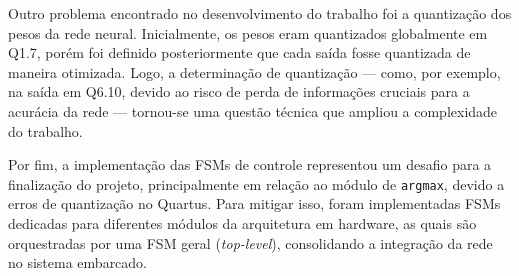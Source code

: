 Outro problema encontrado no desenvolvimento do trabalho foi a quantização dos pesos da rede neural. Inicialmente, os pesos eram quantizados globalmente em Q1.7, porém foi definido posteriormente que cada saída fosse quantizada de maneira otimizada. Logo, a determinação de quantização — como, por exemplo, na saída em Q6.10, devido ao risco de perda de informações cruciais para a acurácia da rede — tornou-se uma questão técnica que ampliou a complexidade do trabalho.

Por fim, a implementação das FSMs de controle representou um desafio para a finalização do projeto, principalmente em relação ao módulo de \texttt{argmax}, devido a erros de quantização no Quartus. Para mitigar isso, foram implementadas FSMs dedicadas para diferentes módulos da arquitetura em hardware, as quais são orquestradas por uma FSM geral (\textit{top-level}), consolidando a integração da rede no sistema embarcado.